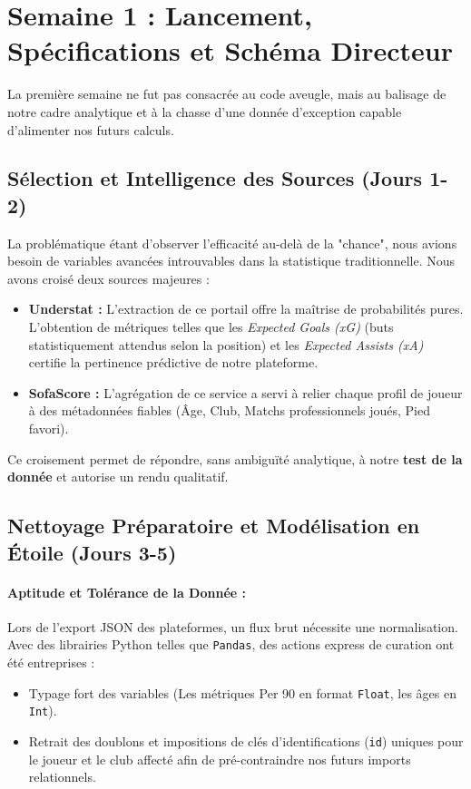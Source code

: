 \documentclass[11pt, a4paper]{article}
\begin{document}
\section{Semaine 1 : Lancement, Spécifications et Schéma Directeur}

La première semaine ne fut pas consacrée au code aveugle, mais au balisage de notre cadre analytique et à la chasse d'une donnée d'exception capable d'alimenter nos futurs calculs.

\subsection{Sélection et Intelligence des Sources (Jours 1-2)}

La problématique étant d'observer l'efficacité au-delà de la "chance", nous avions besoin de variables avancées introuvables dans la statistique traditionnelle. Nous avons croisé deux sources majeures :
\begin{itemize}[label=\textcolor{primary}{$\bullet$}, leftmargin=*]
    \item \textbf{Understat :} L'extraction de ce portail offre la maîtrise de probabilités pures. L'obtention de métriques telles que les \textit{Expected Goals (xG)} (buts statistiquement attendus selon la position) et les \textit{Expected Assists (xA)} certifie la pertinence prédictive de notre plateforme.
    \item \textbf{SofaScore :} L'agrégation de ce service a servi à relier chaque profil de joueur à des métadonnées fiables (Âge, Club, Matchs professionnels joués, Pied favori).
\end{itemize}

Ce croisement permet de répondre, sans ambiguïté analytique, à notre \textbf{test de la donnée} et autorise un rendu qualitatif.

\subsection{Nettoyage Préparatoire et Modélisation en Étoile (Jours 3-5)}

\paragraph{Aptitude et Tolérance de la Donnée :}
Lors de l'export JSON des plateformes, un flux brut nécessite une normalisation. Avec des librairies Python telles que \texttt{Pandas}, des actions express de curation ont été entreprises :
\begin{itemize}[label=\textcolor{primary}{\checkmark}]
    \item Typage fort des variables (Les métriques Per 90 en format \texttt{Float}, les âges en \texttt{Int}).
    \item Retrait des doublons et impositions de clés d'identifications (\texttt{id}) uniques pour le joueur et le club affecté afin de pré-contraindre nos futurs imports relationnels.
\end{itemize}
\end{document}
